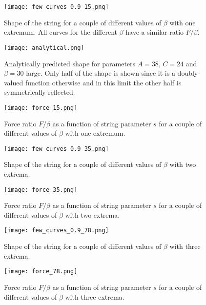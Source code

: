 \documentclass[10pt,a4paper,twocolumn]{article}
\begin{document}
\begin{figure}[t]
    \centering
    \texttt{[image: few\_curves\_0.9\_15.png]}
    \caption{Shape of the string for a couple of different values of $\beta$ with one extremum. All curves for the different $\beta$ have a similar ratio $F/\beta$.}
    \label{fig:few_curves_1}
\end{figure}

\begin{figure}[h]
    \centering
    \texttt{[image: analytical.png]}
    \caption{Analytically predicted shape for parameters $A = 38$, $C = 24$ and $\beta = 30$ large. Only half of the shape is shown since it is a doubly-valued function otherwise and in this limit the other half is symmetrically reflected.}
    \label{fig:analytical}
\end{figure}

\begin{figure}[t]
    \centering
    \texttt{[image: force\_15.png]}
    \caption{Force ratio $F/\beta$ as a function of string parameter $s$ for a couple of different values of $\beta$ with one extremum.}
    \label{fig:force_1}
\end{figure}

\begin{figure}[tbh]
    \centering
    \texttt{[image: few\_curves\_0.9\_35.png]}
    \caption{Shape of the string for a couple of different values of $\beta$ with two extrema.}
    \label{fig:few_curves_2}
\end{figure}

\begin{figure}
    \centering
    \texttt{[image: force\_35.png]}
    \caption{Force ratio $F/\beta$ as a function of string parameter $s$ for a couple of different values of $\beta$ with two extrema.}
    \label{fig:force_2}
\end{figure}

\begin{figure}[h]
    \centering
    \texttt{[image: few\_curves\_0.9\_78.png]}
    \caption{Shape of the string for a couple of different values of $\beta$ with three extrema.}
    \label{fig:few_curves_3}
\end{figure}

\begin{figure}[h]
    \centering
    \texttt{[image: force\_78.png]}
    \caption{Force ratio $F/\beta$ as a function of string parameter $s$ for a couple of different values of $\beta$ with three extrema.}
    \label{fig:force_3}
\end{figure}
\end{document}
